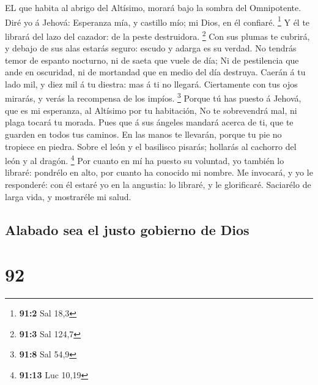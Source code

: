  EL que habita al abrigo del Altísimo, morará bajo la sombra
del Omnipotente.  Diré yo á Jehová: Esperanza mía, y
castillo mío; mi Dios, en él confiaré. \footnote{\textbf{91:2} Sal 18,3}
 Y él te librará del lazo del cazador: de la peste
destruidora. \footnote{\textbf{91:3} Sal 124,7}  Con sus
plumas te cubrirá, y debajo de sus alas estarás seguro: escudo y adarga
es su verdad.  No tendrás temor de espanto nocturno, ni de
saeta que vuele de día;  Ni de pestilencia que ande en
oscuridad, ni de mortandad que en medio del día destruya. 
Caerán á tu lado mil, y diez mil á tu diestra: mas á ti no llegará.
 Ciertamente con tus ojos mirarás, y verás la recompensa de
los impíos. \footnote{\textbf{91:8} Sal 54,9}  Porque tú has
puesto á Jehová, que es mi esperanza, al Altísimo por tu habitación,
 No te sobrevendrá mal, ni plaga tocará tu morada.
 Pues que á sus ángeles mandará acerca de ti, que te
guarden en todos tus caminos.  En las manos te llevarán,
porque tu pie no tropiece en piedra.  Sobre el león y el
basilisco pisarás; hollarás al cachorro del león y al dragón.
\footnote{\textbf{91:13} Luc 10,19}  Por cuanto en mí ha
puesto su voluntad, yo también lo libraré: pondrélo en alto, por cuanto
ha conocido mi nombre.  Me invocará, y yo le responderé:
con él estaré yo en la angustia: lo libraré, y le glorificaré.
 Saciarélo de larga vida, y mostraréle mi salud.

\hypertarget{alabado-sea-el-justo-gobierno-de-dios}{%
\subsection{Alabado sea el justo gobierno de
Dios}\label{alabado-sea-el-justo-gobierno-de-dios}}

\hypertarget{section-91}{%
\section{92}\label{section-91}}

